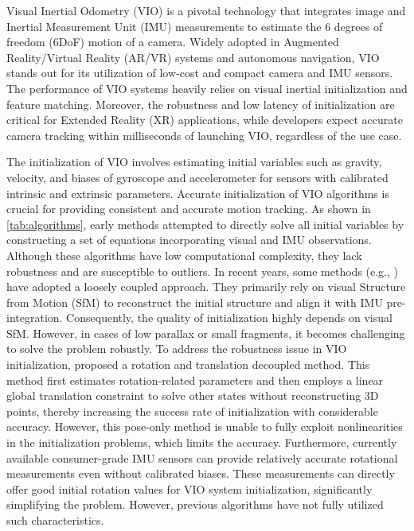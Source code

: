 
Visual Inertial Odometry (VIO) is a pivotal technology that integrates image and Inertial Measurement Unit (IMU) measurements to estimate the 6 degrees of freedom (6DoF) motion of a camera. Widely adopted in Augmented Reality/Virtual Reality (AR/VR) systems and autonomous navigation, VIO stands out for its utilization of low-cost and compact camera and IMU sensors. The performance of VIO systems heavily relies on visual inertial initialization and feature matching. Moreover, the robustness and low latency of initialization are critical for Extended Reality (XR) applications, while developers expect accurate camera tracking within milliseconds of launching VIO, regardless of the use case.

The initialization of VIO involves estimating initial variables such as gravity, velocity, and biases of gyroscope and accelerometer for sensors with calibrated intrinsic and extrinsic parameters. Accurate initialization of VIO algorithms is crucial for providing consistent and accurate motion tracking. 
    As shown in \cref{tab:algorithms}, early methods \cite{Dong-Si_initialization, martinelli2014closed} attempted to directly solve all initial variables by constructing a set of equations incorporating visual and IMU observations. Although these algorithms have low computational complexity, they lack robustness and are susceptible to outliers. 
    In recent years, some methods (e.g., \cite{qin-tro-2018_VINS-Mono,campos2020inertial,zuniga2021analytical,campos2019fast, Qin_Shen_2017}) have adopted a loosely coupled approach. They primarily rely on visual Structure from Motion (SfM) to reconstruct the initial structure and align it with IMU pre-integration\cite{forster2017manifold-preintergration}. Consequently, the quality of initialization highly depends on visual SfM. However, in cases of low parallax or small fragments, it becomes challenging to solve the problem robustly. 
    To address the robustness issue in VIO initialization, \cite{Rotation-Translation-Decoupled} proposed a rotation and translation decoupled method. This method first estimates rotation-related parameters and then employs a linear global translation constraint to solve other states without reconstructing 3D points, thereby increasing the success rate of initialization with considerable accuracy. However, this pose-only method is unable to fully exploit nonlinearities in the initialization problems, which limits the accuracy. 
    Furthermore, currently available consumer-grade IMU sensors can provide relatively accurate rotational measurements even without calibrated biases. These measurements can directly offer good initial rotation values for VIO system initialization, significantly simplifying the problem. However, previous algorithms have not fully utilized such characteristics. 


